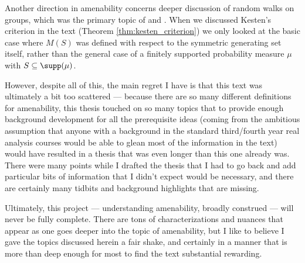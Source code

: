 Another direction in amenability concerns deeper discussion of random walks on groups, which was the primary topic of \cite{kesten_means} and \cite{kesten_random_walks}. When we discussed Kesten's criterion in the text (Theorem \ref{thm:kesten_criterion}) we only looked at the basic case where $M(S)$ was defined with respect to the symmetric generating set itself, rather than the general case of a finitely supported probability measure $\mu$ with $S\subseteq \supp(\mu)$.\newline

However, despite all of this, the main regret I have is that this text was ultimately a bit too scattered --- because there are so many different definitions for amenability, this thesis touched on so many topics that to provide enough background development for all the prerequisite ideas (coming from the ambitious assumption that anyone with a background in the standard third/fourth year real analysis courses would be able to glean most of the information in the text) would have resulted in a thesis that was even longer than this one already was. There were many points while I drafted the thesis that I had to go back and add particular bits of information that I didn't expect would be necessary, and there are certainly many tidbits and background highlights that are missing.\newline

Ultimately, this project --- understanding amenability, broadly construed --- will never be fully complete. There are tons of characterizations and nuances that appear as one goes deeper into the topic of amenability, but I like to believe I gave the topics discussed herein a fair shake, and certainly in a manner that is more than deep enough for most to find the text substantial rewarding.
